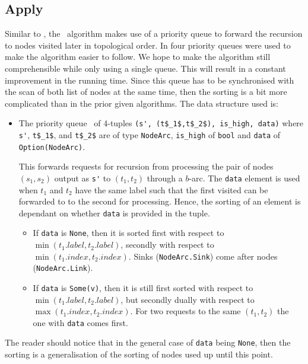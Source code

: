 \subsection{Apply} \label{sec:theory__apply}
Similar to \Restrict, the \Apply\ algorithm makes use of a priority queue to
forward the recursion to nodes visited later in topological order. In
\cite{Arge96} four priority queues were used to make the algorithm easier to
follow. We hope to make the algorithm still comprehensible while only using a
single queue. This will result in a constant improvement in the running time.
Since this queue has to be synchronised with the scan of both list of nodes at
the same time, then the sorting is a bit more complicated than in the prior
given algorithms. The data structure used is:
\begin{itemize}
\item The priority queue \ApplyQrec\ of 4-tuples \lstinline{(s', (t$_1$,t$_2$), is_high, data)}
  where \lstinline{s'}, \lstinline{t$_1$}, and \lstinline{t$_2$} are of
  type \lstinline{NodeArc}, \lstinline{is_high} of \lstinline{bool} and
  \lstinline{data} of \lstinline{Option(NodeArc)}.

  This forwards requests for recursion from processing the pair of nodes $(s_1,
  s_2)$ output as \lstinline{s'} to $(t_1,t_2)$ through a $b$-arc. The
  \lstinline{data} element is used when $t_1$ and $t_2$ have the same label such
  that the first visited can be forwarded to to the second for processing.
  Hence, the sorting of an element is dependant on whether \lstinline{data} is
  provided in the tuple.

  \begin{itemize}
  \item If \lstinline{data} is \lstinline{None}, then it is sorted first with
    respect to $\min(t_1.\mathit{label},t_2.\mathit{label})$, secondly with
    respect to $\min(t_1.\mathit{index},t_2.\mathit{index})$. Sinks
    (\lstinline{NodeArc.Sink}) come after nodes\\(\lstinline{NodeArc.Link}).

  \item If \lstinline{data} is \lstinline{Some(v)}, then it is still first
    sorted with respect to $\min(t_1.\mathit{label},t_2.\mathit{label})$, but
    secondly dually with respect to $\max(t_1.\mathit{index},
    t_2.\mathit{index})$. For two requests to the same $(t_1,t_2)$ the one with
    \lstinline{data} comes first.
  \end{itemize}
\end{itemize}
The reader should notice that in the general case of \lstinline{data} being
\lstinline{None}, then the sorting is a generalisation of the sorting of nodes
used up until this point.

